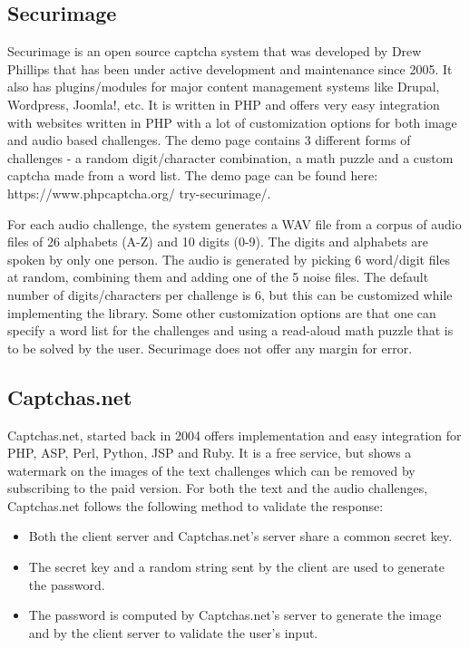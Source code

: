 \subsection{Securimage}

Securimage is an open source captcha system that was developed by Drew Phillips that has 
been under active development and maintenance since 2005. It also has plugins/modules for 
major content management systems like Drupal, Wordpress, Joomla!, etc. It is written in PHP 
and offers very easy integration with websites written in PHP with a lot of customization 
options for both image and audio based challenges. The demo page contains 3 different forms 
of challenges - a random digit/character combination, a math puzzle and a custom captcha 
made from a word list. The demo page can be found here: https://www.phpcaptcha.org/
try-securimage/.

For each audio challenge, the system generates a WAV file from a corpus of audio files of 26 
alphabets (A-Z) and 10 digits (0-9). The digits and alphabets are spoken by only one person. 
The audio is generated by picking 6 word/digit files at random, combining them and adding one 
of the 5 noise files. The default number of digits/characters per challenge is 6, but this can 
be customized while implementing the library. Some other customization options are that one can 
specify a word list for the challenges and using a read-aloud math puzzle that is to be solved 
by the user. Securimage does not offer any margin for error.

\subsection{Captchas.net}

Captchas.net, started back in 2004 offers implementation and easy integration for PHP, ASP, Perl, 
Python, JSP and Ruby. It is a free service, but shows a watermark on the images of the text challenges 
which can be removed by subscribing to the paid version. For both the text and the audio challenges, 
Captchas.net follows the following method to validate the response:

\begin{itemize}
\item Both the client server and Captchas.net's server share a common secret key.
\item The secret key and a random string sent by the client are used to generate the password.
\item The password is computed by Captchas.net's server to generate the image and by the client server to validate the user's input.
\end{itemize}

